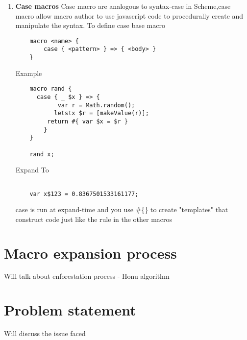 \begin{enumerate}
\item {\bf Case macros }
Case macro are analogous to syntax-case in Scheme,case macro allow macro author to use javascript code to procedurally create and manipulate the syntax.
To define case base macro
\begin{lstlisting}
	macro <name> {
  		case { <pattern> } => { <body> }
	}
\end{lstlisting}
Example
\begin{lstlisting}
	macro rand {
  	  case { _ $x } => {
    	    var r = Math.random();
     	   letstx $r = [makeValue(r)];
      	 return #{ var $x = $r }
   		}
	}

	rand x;
\end{lstlisting}

Expand To

\begin{lstlisting}

	var x$123 = 0.8367501533161177;
\end{lstlisting}
case is run at expand-time and you use \#\{\} to create "templates" that construct code just like the rule in the other macros

\end{enumerate}

\section{Macro expansion process}

Will talk about enforestation process - Honu algorithm

\section{Problem statement}

Will discuss the issue faced